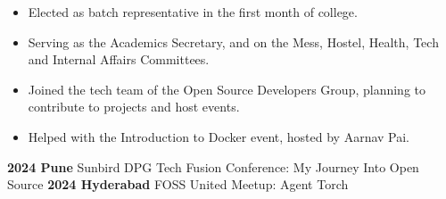 \documentclass{resume}
\begin{document}
\vspace{1em}

\begin{adjustwidth}{2em}{0em}


\end{adjustwidth}
\vspace{1em}

\begin{multicols}{2}
    \begin{itemize}
        \item Elected as batch representative in the first month of college.
        \item Serving as the Academics Secretary, and on the Mess, Hostel, Health, Tech and Internal Affairs Committees. 
    \end{itemize}
    \begin{itemize}
        \item Joined the tech team of the Open Source Developers Group, planning to contribute to projects and host events.
        \item Helped with the Introduction to Docker event, hosted by Aarnav Pai.
    \end{itemize}
    \columnbreak
    \begin{adjustwidth}{1em}{0em}
    \textbf{2024 Pune}
    \newline Sunbird DPG Tech Fusion Conference: My Journey Into Open Source
    \newline \newline
    \textbf{2024 Hyderabad}
    \newline FOSS United Meetup: Agent Torch
    \end{adjustwidth}
\end{multicols}
\vspace{1em}
\end{document}

